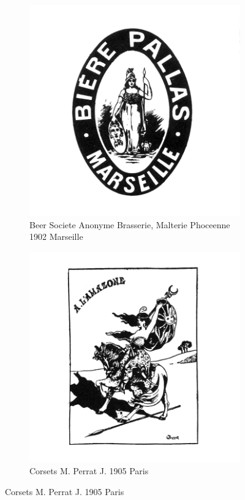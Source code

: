 \begin{figure}[h]
  \begin{subfigure}{.45\textwidth}
    \centering
    \includegraphics[width=.5\linewidth]{images/supplement/trademarks/french/2_3}
    \caption{Beer Societe Anonyme Brasserie, Malterie Phoceenne 1902 Marseille}
    \label{fig:trademarks:french:2.3}
  \end{subfigure}\hfill
  \begin{subfigure}{.45\textwidth}
    \centering
    \includegraphics[width=.5\linewidth]{images/supplement/trademarks/french/2_4}
    \caption{Corsets M. Perrat J. 1905 Paris}
    \label{fig:trademarks:french:2.4}
  \end{subfigure}


\end{figure}
